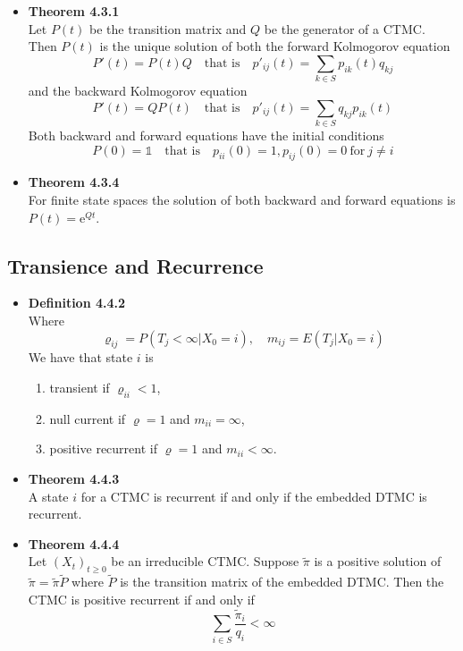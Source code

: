 \documentclass[11pt,a4paper]{article}
\begin{document}
\begin{itemize}
    \item \textbf{Theorem 4.3.1} \\
        Let $P(t)$ be the transition matrix and $Q$ be the generator of a CTMC\@.
        Then $P(t)$ is the unique solution of both the forward Kolmogorov equation
        \[
            P'(t) = P(t) Q \quad \text{that is} \quad p'_{ij}(t) = \sum_{k \in S}p_{ik}(t)q_{kj}
        \]
        and the backward Kolmogorov equation
        \[
            P'(t) = Q P(t) \quad \text{that is} \quad p'_{ij}(t) = \sum_{k \in S}q_{kj}p_{ik}(t)
        \]
        Both backward and forward equations have the initial conditions
        \[
            P(0) = \mathds{1} \quad \text{that is} \quad p_{ii}(0) = 1, p_{ij}(0) = 0 \
            \text{for} \ j \neq i
        \]
    \item \textbf{Theorem 4.3.4} \\
        For finite state spaces the solution of both backward and
        forward equations is
        $P(t) = \mathrm{e}^{Qt}$.

\end{itemize}

\subsection{Transience and Recurrence}

\begin{itemize}
    \item \textbf{Definition 4.4.2} \\
        Where
        \[
            \varrho_{ij} = P(T_j < \infty | X_0 = i), \quad m_{ij} = E(T_j | X_0 = i)
        \]
        We have that state $i$ is
        \begin{enumerate}
            \item transient if $\varrho_{ii} < 1$,
            \item null current if $\varrho = 1$ and $m_{ii} = \infty$,
            \item positive recurrent if $\varrho = 1$ and $m_{ii} < \infty$.
        \end{enumerate}
    \item \textbf{Theorem 4.4.3} \\
        A state $i$ for a CTMC is recurrent if and only if the embedded
        DTMC is recurrent.
    \item \textbf{Theorem 4.4.4} \\
        Let ${(X_t)}_{t \geq 0}$ be an irreducible CTMC\@.
        Suppose $\widetilde{\pi}$ is a positive solution of
        $\widetilde{\pi} = \widetilde{\pi} \widetilde{P}$ where $\widetilde{P}$ is the transition
        matrix of the embedded DTMC\@.
        Then the CTMC is positive recurrent if and only if
        \[
            \sum_{i \in S} \frac{\widetilde{\pi}_i}{q_i} < \infty
        \]
\end{itemize}
\end{document}
